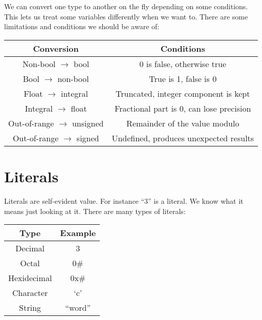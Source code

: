 \documentclass[12pt, a4paper]{report}
\begin{document}
\noindent We can convert one type to another on the fly depending on some conditions. This lets us treat some variables differently when we want to. There are some limitations and conditions we should be aware of:
\begin{center}
	\begin{tabular}{ |c|c| }
		\hline
		\textbf{Conversion} & \textbf{Conditions} \\
		\hline
		Non-bool $\rightarrow$ bool & 0 is false, otherwise true \\
		\hline
		Bool $\rightarrow$ non-bool & True is 1, false is 0 \\
		\hline
		Float $\rightarrow$ integral & Truncated, integer component is kept \\
		\hline
		Integral $\rightarrow$ float & Fractional part is 0, can lose precision \\
		\hline
		Out-of-range $\rightarrow$ unsigned & Remainder of the value modulo \\
		\hline
		Out-of-range $\rightarrow$ signed & Undefined, produces unexpected results \\
		\hline
	\end{tabular}
\end{center}
\section{Literals}
Literals are self-evident value. For instance ``3'' is a literal. We know what it means just looking at it. There are many types of literals:
\begin{center}
	\begin{tabular}{ |c|c| }
		\hline
		\textbf{Type} & \textbf{Example} \\
		\hline
		Decimal & 3 \\
		\hline
		Octal & 0\# \\
		\hline
		Hexidecimal & 0x\# \\
		\hline
		Character & `c' \\
		\hline
		String & ``word'' \\
		\hline
	\end{tabular}
\end{center}
\end{document}
